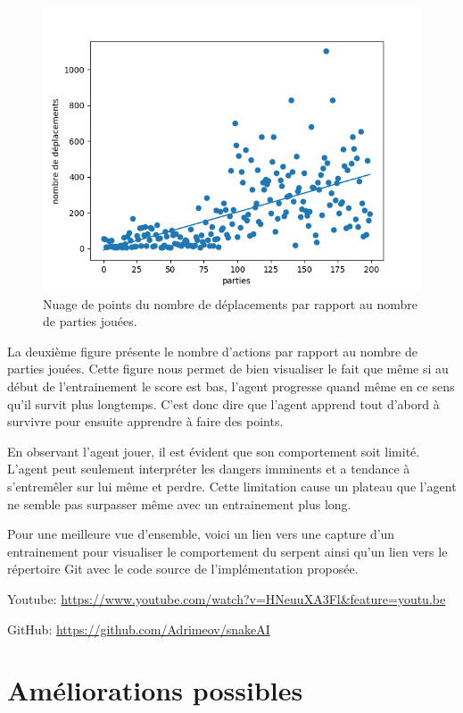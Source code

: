 \documentclass{article}
\begin{document}
\begin{figure}[ht]
	\includegraphics[width=\linewidth]{moves_per_game_200.png}
	\caption{Nuage de points du nombre de déplacements par rapport au nombre de parties jouées.}
	\label{fig:Snake}
\end{figure}

La deuxième figure présente le nombre d'actions par rapport au nombre de parties jouées. Cette figure nous permet de bien visualiser le fait que même si au début de l'entrainement le score est bas, l'agent progresse quand même en ce sens qu'il survit plus longtemps. C'est donc dire que l'agent apprend tout d'abord à survivre pour ensuite apprendre à faire des points.  

En observant l'agent jouer, il est évident que son comportement soit limité. L'agent peut seulement interpréter les dangers imminents et a tendance à s'entremêler sur lui même et perdre. Cette limitation cause un plateau que l'agent ne semble pas surpasser même avec un entrainement plus long.


Pour une meilleure vue d'ensemble, voici un lien vers une capture d’un entrainement pour visualiser le comportement du serpent ainsi qu'un lien vers le répertoire Git avec le code source de l'implémentation proposée.

Youtube: 
\href{https://www.youtube.com/watch?v=HNeuuXA3Flg&feature=youtu.be}{https://www.youtube.com/watch?v=HNeuuXA3Fl\&feature=youtu.be}

GitHub: 
\href{https://github.com/Adrimeov/snakeAI}{https://github.com/Adrimeov/snakeAI}


\section{Améliorations possibles}
\end{document}
